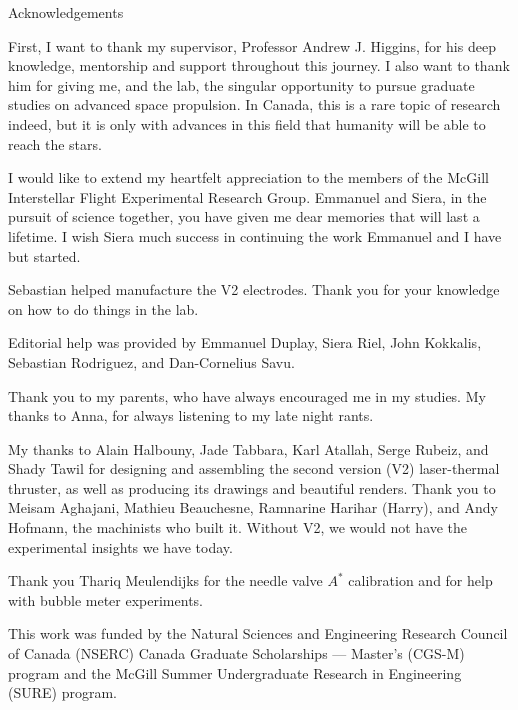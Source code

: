 \begin{plainchp}{Acknowledgements}
    
    First, I want to thank my supervisor, Professor Andrew J. Higgins, for his deep knowledge, mentorship and support throughout this journey. I also want to thank him for giving me, and the lab, the singular opportunity to pursue graduate studies on advanced space propulsion. In Canada, this is a rare topic of research indeed, but it is only with advances in this field that humanity will be able to reach the stars.

    I would like to extend my heartfelt appreciation to the members of the McGill Interstellar Flight Experimental Research Group. Emmanuel and Siera, in the pursuit of science together, you have given me dear memories that will last a lifetime. I wish Siera much success in continuing the work Emmanuel and I have but started.

    Sebastian helped manufacture the V2 electrodes. Thank you for your knowledge on how to do things in the lab.

    Editorial help was provided by Emmanuel Duplay, Siera Riel, John Kokkalis, Sebastian Rodriguez, and Dan-Cornelius Savu.
    
    Thank you to my parents, who have always encouraged me in my studies. My thanks to Anna, for always listening to my late night rants.

    My thanks to Alain Halbouny, Jade Tabbara, Karl Atallah, Serge Rubeiz, and Shady Tawil for designing and assembling the second version (V2) laser-thermal thruster, as well as producing its drawings and beautiful renders. Thank you to Meisam Aghajani, Mathieu Beauchesne, Ramnarine Harihar (Harry), and Andy Hofmann, the machinists who built it. Without V2, we would not have the experimental insights we have today.

    Thank you Thariq Meulendijks for the needle valve $A^*$ calibration and for help with bubble meter experiments.

    This work was funded by the Natural Sciences and Engineering Research Council of Canada (NSERC) Canada Graduate Scholarships — Master’s (CGS-M) program and the McGill Summer Undergraduate Research in Engineering (SURE) program.

\end{plainchp}